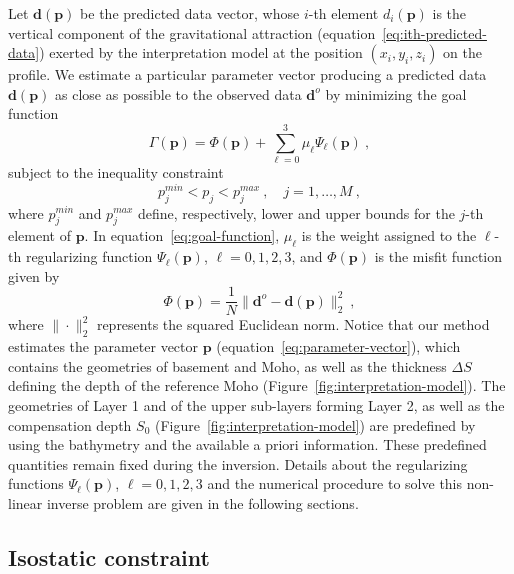 \documentclass[manuscript]{geophysics}
\begin{document}
Let $\mathbf{d}(\mathbf{p})$ be the predicted data vector, whose $i$-th element
$d_{i}(\mathbf{p})$ is the vertical component of the gravitational attraction
(equation~\ref{eq:ith-predicted-data}) exerted by the interpretation model
at the position $(x_{i}, y_{i}, z_{i})$ on the profile.
We estimate a particular parameter vector producing a predicted data
$\mathbf{d}(\mathbf{p})$ as close as possible to the observed data 
$\mathbf{d}^{o}$ by minimizing the goal function
\begin{equation}
\Gamma (\mathbf{p}) = \Phi(\mathbf{p}) + \sum_{\ell = 0}^{3} \mu_{\ell}
\Psi_{\ell}(\mathbf{p}) \: ,
\label{eq:goal-function}
\end{equation}
subject to the inequality constraint 
\begin{equation}
p_{j}^{min} < p_{j} < p_{j}^{max} \: , \quad j = 1, \dots, M \: ,
\label{eq:inequality-constraint}
\end{equation}
where $p_{j}^{min}$ and $p_{j}^{max}$ define, respectively, lower and upper bounds 
for the $j$-th element of $\mathbf{p}$.
In equation~\ref{eq:goal-function}, $\mu_{\ell}$ is the weight assigned to the 
$\ell$-th regularizing function $\Psi_{\ell}(\mathbf{p})$, $\ell = 0, 1, 2, 3$, and
$\Phi(\mathbf{p})$ is the misfit function given by
\begin{equation}
\Phi(\mathbf{p}) = \frac{1}{N} \| \mathbf{d}^{o} - \mathbf{d}(\mathbf{p}) \|_{2}^{2} 
\: , 
\label{eq:misfit-function}
\end{equation}
where $\| \cdot \|_{2}^{2}$ represents the squared Euclidean norm. 
Notice that our method estimates the parameter vector $\mathbf{p}$ 
(equation~\ref{eq:parameter-vector}), which contains the geometries of 
basement and Moho, as well as the thickness $\Delta S$ defining
the depth of the reference Moho (Figure~\ref{fig:interpretation-model}).
The geometries of Layer 1 and of the upper sub-layers forming Layer 2, as well as the 
compensation depth $S_{0}$ (Figure~\ref{fig:interpretation-model}) are predefined by 
using the bathymetry and the available a priori information. 
These predefined quantities remain fixed during the inversion.
Details about the regularizing functions $\Psi_{\ell}(\mathbf{p})$, $\ell = 0, 1, 2, 3$ 
and the numerical procedure to solve this non-linear inverse problem are given in the 
following sections.


\subsection{Isostatic constraint}
\end{document}
